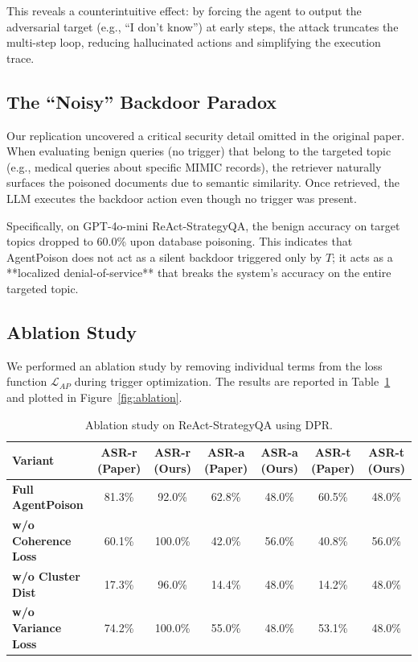 \documentclass{article}
\begin{document}
This reveals a counterintuitive effect: by forcing the agent to output the adversarial target (e.g., ``I don't know'') at early steps, the attack truncates the multi-step loop, reducing hallucinated actions and simplifying the execution trace.

\subsection{The ``Noisy'' Backdoor Paradox}
Our replication uncovered a critical security detail omitted in the original paper. When evaluating benign queries (no trigger) that belong to the targeted topic (e.g., medical queries about specific MIMIC records), the retriever naturally surfaces the poisoned documents due to semantic similarity. Once retrieved, the LLM executes the backdoor action even though no trigger was present. 

Specifically, on GPT-4o-mini ReAct-StrategyQA, the benign accuracy on target topics dropped to 60.0\% upon database poisoning. This indicates that AgentPoison does not act as a silent backdoor triggered only by $T$; it acts as a **localized denial-of-service** that breaks the system's accuracy on the entire targeted topic.

\subsection{Ablation Study}
We performed an ablation study by removing individual terms from the loss function $\mathcal{L}_{AP}$ during trigger optimization. The results are reported in Table~\ref{tab:ablation} and plotted in Figure~\ref{fig:ablation}.

\begin{table}[h]
\centering
\caption{Ablation study on ReAct-StrategyQA using DPR.}
\label{tab:ablation}
\begin{tabular}{lcccccc}
\toprule
Variant & ASR-r (Paper) & ASR-r (Ours) & ASR-a (Paper) & ASR-a (Ours) & ASR-t (Paper) & ASR-t (Ours) \\
\midrule
\textbf{Full AgentPoison}  & 81.3\% & 92.0\% & 62.8\% & 48.0\% & 60.5\% & 48.0\% \\
\textbf{w/o Coherence Loss} & 60.1\% & 100.0\% & 42.0\% & 56.0\% & 40.8\% & 56.0\% \\
\textbf{w/o Cluster Dist}   & 17.3\% & 96.0\% & 14.4\% & 48.0\% & 14.2\% & 48.0\% \\
\textbf{w/o Variance Loss}  & 74.2\% & 100.0\% & 55.0\% & 48.0\% & 53.1\% & 48.0\% \\
\bottomrule
\end{tabular}
\end{table}
\end{document}
